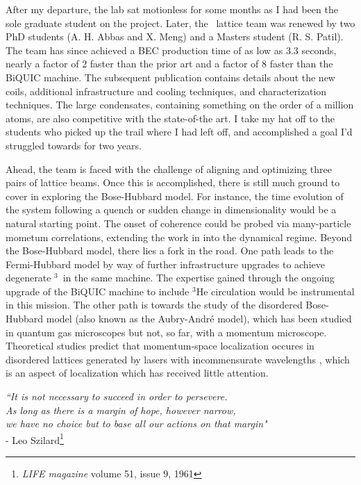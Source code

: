 	After my departure, the lab sat motionless for some months as I had been the sole graduate student on the project.
	Later, the \mhe~lattice team was renewed by two PhD students (A. H.	Abbas and X. Meng) and a Masters student (R. S. Patil).
	The team has since achieved a BEC production time of as low as 3.3 seconds, nearly a factor of 2 faster than the prior art \cite{Bouton15} and a factor of 8 faster than the BiQUIC machine.
	The subsequent publication \cite{Abbas21} contains details about the new coils, additional infrastructure and cooling techniques, and characterization techniques.
	The large condensates, containing something on the order of a million atoms, are also competitive with the state-of-the art.
	I take my hat off to the students who picked up the trail where I had left off, and accomplished a goal I'd struggled towards for two years.


	Ahead, the team is faced with the challenge of aligning and optimizing three pairs of lattice beams.
	Once this is accomplished, there is still much ground to cover in exploring the Bose-Hubbard model.
	For instance, the time evolution of the system following a quench or sudden change in dimensionality would be a natural starting point.
	The onset of coherence could be probed via many-particle mometum correlations, extending the work in \cite{Carcy19} into the dynamical regime.	
	Beyond the Bose-Hubbard model, there lies a fork in the road.
	One path leads to the Fermi-Hubbard model by way of further infrastructure upgrades to achieve degenerate $^3$\mhe~in the same machine.
	The expertise gained through the ongoing upgrade of the BiQUIC machine to include $^3$He circulation would be instrumental in this mission.
	The other path is towards the study of the disordered Bose-Hubbard model (also known as the Aubry-Andr\'{e} model), which has been studied in quantum gas microscopes \cite{Rispoli19} but not, so far, with a momentum microscope.
	Theoretical studies predict that momentum-space localization occures in disordered lattices generated by lasers with incommensurate wavelengths \cite{Larcher11}, which is an aspect of localization which has received little attention.
	\vfill
	\begin{flushright}
	\singlespacing
	\emph{``It is not necessary to succeed in order to persevere.\\
	As long as there is a margin of hope, however narrow, \\
	we have no choice but to base all our actions on that margin"}\\
	- Leo Szilard\footnote{\emph{LIFE magazine} volume 51, issue 9, 1961 }\\
	\end{flushright}
	\onehalfspacing

	